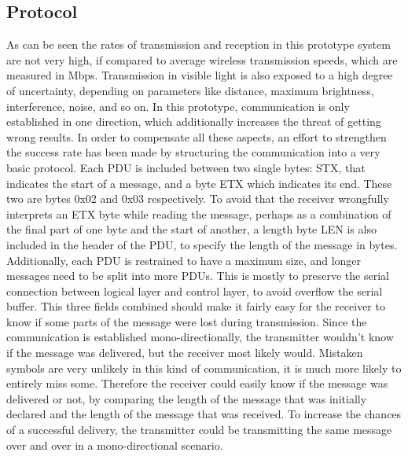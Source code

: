 \subsection{Protocol}
As can be seen the rates of transmission and reception in this prototype system are not very high, if compared to average wireless transmission speeds, which are measured in Mbps.
Transmission in visible light is also exposed to a high degree of uncertainty, depending on parameters like distance, maximum brightness, interference, noise, and so on.
In this prototype, communication is only established in one direction, which additionally increases the threat of getting wrong results.
In order to compensate all these aspects, an effort to strengthen the success rate has been made by structuring the communication into a very basic protocol.
Each PDU is included between two single bytes: STX, that indicates the start of a message, and a byte ETX which indicates its end. 
These two are bytes 0x02 and 0x03 respectively.
To avoid that the receiver wrongfully interprets an ETX byte while reading the message, perhaps as a combination of the final part of one byte and the start of another, a length byte LEN is also included in the header of the PDU, to specify the length of the message in bytes.
Additionally, each PDU is restrained to have a maximum size, and longer messages need to be split into more PDUs.
This is mostly to preserve the serial connection between logical layer and control layer, to avoid overflow the serial buffer.
This three fields combined should make it fairly easy for the receiver to know if some parts of the message were lost during transmission.
Since the communication is established mono-directionally, the transmitter wouldn't know if the message was delivered, but the receiver most likely would.
Mistaken symbols are very unlikely in this kind of communication, it is much more likely to entirely miss some.
Therefore the receiver could easily know if the message was delivered or not, by comparing the length of the message that was initially declared and the length of the message that was received.
To increase the chances of a successful delivery, the transmitter could be transmitting the same message over and over in a mono-directional scenario.

